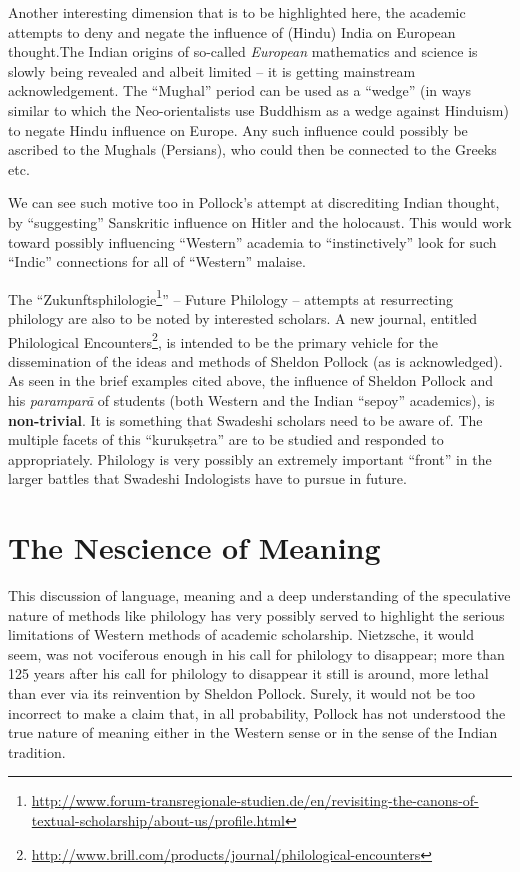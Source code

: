 Another interesting dimension that is to be highlighted here, the academic attempts to deny and negate the influence of (Hindu) India on European thought.The Indian origins of so-called \textit{European} mathematics and science is slowly being revealed and albeit limited – it is getting mainstream acknowledgement. The “Mughal” period can be used as a “wedge” (in ways similar to which the Neo-orientalists use Buddhism as a wedge against Hinduism) to negate Hindu influence on Europe. Any such influence could possibly be ascribed to the Mughals (Persians), who could then be connected to the Greeks etc.

We can see such motive too in Pollock’s attempt at discrediting Indian thought, by “suggesting” Sanskritic influence on Hitler and the holocaust. This would work toward possibly influencing “Western” academia to “instinctively” look for such “Indic” connections for all of “Western” malaise. 

The “Zukunftsphilologie\footnote{\url{http://www.forum-transregionale-studien.de/en/revisiting-the-canons-of-textual-scholarship/about-us/profile.html}}” – Future Philology – attempts at resurrecting philology are also to be noted by interested scholars. A new journal, entitled Philological Encounters\footnote{\url{http://www.brill.com/products/journal/philological-encounters}}, is intended to be the primary vehicle for the dissemination of the ideas and methods of Sheldon Pollock (as is acknowledged). As seen in the brief examples cited above, the influence of Sheldon Pollock and his \textit{paramparā} of students (both Western and the Indian “sepoy” academics), is \textbf{non-trivial}. It is something that Swadeshi scholars need to be aware of. The multiple facets of this “kurukṣetra” are to be studied and responded to appropriately. Philology is very possibly an extremely important “front” in the larger battles that Swadeshi Indologists have to pursue in future.

\newpage

\section*{The Nescience of Meaning}

\vskip -5pt

This discussion of language, meaning and a deep understanding of the speculative nature of methods like philology has very possibly served to highlight the serious limitations of Western methods of academic scholarship. Nietzsche, it would seem, was not vociferous enough in his call for philology to disappear; more than 125 years after his call for philology to disappear it still is around, more lethal than ever via its reinvention by Sheldon Pollock. Surely, it would not be too incorrect to make a claim that, in all probability, Pollock has not understood the true nature of meaning either in the Western sense or in the sense of the Indian tradition.

